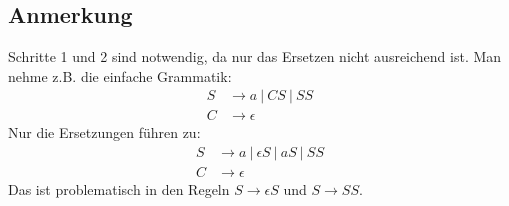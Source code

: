 \documentclass{article}
\begin{document}
\subsection*{Anmerkung}
Schritte 1 und 2 sind notwendig, da nur das Ersetzen nicht ausreichend ist. Man nehme z.B. die einfache Grammatik:
\begin{align*}
S &\rightarrow a\ |\ CS\ |\ SS \\
C &\rightarrow \epsilon
\end{align*}
Nur die Ersetzungen führen zu:
\begin{align*}
S &\rightarrow a\ |\ \epsilon S\ |\ aS\ |\ SS \\
C &\rightarrow \epsilon
\end{align*}
Das ist problematisch in den Regeln $S \rightarrow \epsilon S$ und $S \rightarrow SS$.
\end{document}
